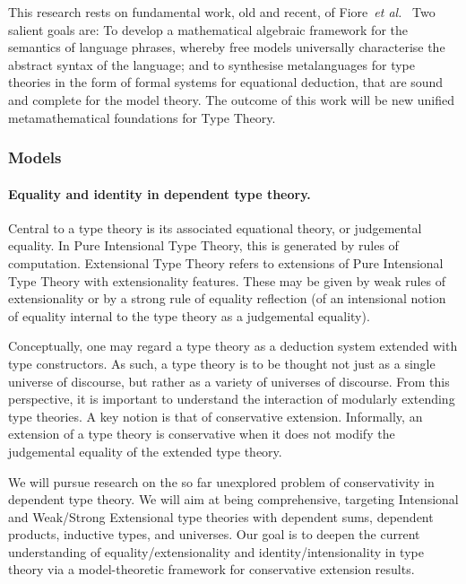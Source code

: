 \documentclass[11pt,twocolumn]{article}
\newcommand{\hl}[1]{#1}%
\newcommand{\etal}{\emph{et al.}}
\begin{document}
This research rests on fundamental work, old and recent, of
Fiore~\etal\
Two salient \hl{goals} are: To develop a mathematical algebraic framework
for the semantics of language phrases, whereby free models universally
characterise the abstract syntax of the language; and to synthesise
metalanguages for type theories in the form of formal systems for equational
deduction, that are sound and complete for the model theory.  The outcome of
this work will be new unified metamathematical foundations for Type Theory.

\subsubsection{Models}
\label{Models}

\paragraph{Equality and identity in dependent type theory.}
\label{IntensionalTypeTheoryParagraph}

Central to a type theory is its associated equational theory, or judgemental
equality.  In Pure Intensional Type Theory, this is generated by rules of
computation.  Extensional Type Theory refers to extensions of Pure Intensional
Type Theory with extensionality features.  These may be given by weak rules of
extensionality or by a strong rule of equality reflection (of an intensional
notion of equality internal to the type theory as a judgemental equality).  

Conceptually, one may regard a type theory as a deduction system extended with
type constructors.  As such, a type theory is to be thought not just as a
single universe of discourse, but rather as a variety of universes of
discourse.  From this perspective, it is important to understand the
interaction of modularly extending type theories.  A key notion is that of
conservative extension.  
\pagebreak%
Informally, an extension of a type theory is
conservative when it does not modify the judgemental equality of the extended
type theory.

We will pursue \hl{research} on the so far unexplored problem of
conservativity in dependent type theory.  We will \hl{aim} at being
comprehensive, targeting Intensional and Weak/Strong Extensional type theories
with dependent sums, dependent products, inductive types, and universes.  Our
\hl{goal} is to deepen the current understanding of equality/extensionality
and identity/intensionality in type theory via a model-theoretic framework for
conservative extension results.  
\end{document}
